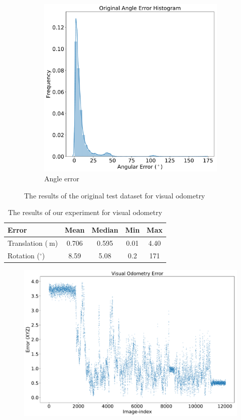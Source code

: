 \documentclass{article}
\begin{document}
\begin{figure}[H]
\begin{subfigure}[b]{0.45\textwidth}
    \includegraphics[width=\textwidth]{../figures/origangle.pdf}
    \caption{Angle error}
  \end{subfigure}
  \caption{The results of the original test dataset for visual odometry}
\end{figure}

\begin{table}
  \centering
  \begin{tabular}{l | c | c | c | c }
    Error &  Mean & Median & Min & Max \\
    \hline
    Translation ($\SI{}{\meter}$) &  0.706 & 0.595 & 0.01 & 4.40  \\
    Rotation ($^\circ$)           &  8.59  & 5.08  & 0.2  & 171

  \end{tabular}
  \caption{The results of our experiment for visual odometry}
\end{table}



\begin{figure}[H]
  \centering
  \includegraphics[width=\textwidth]{../figures/viconerr.pdf}
\end{figure}
\end{document}
